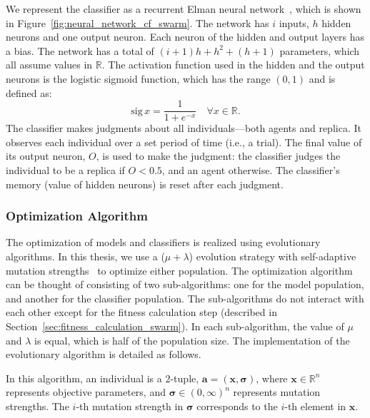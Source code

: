 We represent the classifier as a recurrent Elman neural network~\cite{Elman1990}, which is shown in Figure~\ref{fig:neural_network_cf_swarm}. The network has $i$ inputs, $h$ hidden neurons and one output neuron. Each neuron of the hidden and output layers has a bias. The network has a total of $(i+1) h + h^2 + (h+1)$ parameters, which all assume values in $\mathbb{R}$. The activation function used in the hidden and the output neurons is the logistic sigmoid function, which has the range $\left(0,1\right)$ and is defined as: 
%
\begin{equation}\label{equ:logistic_sigmoid}
\textrm{sig}\,x = \frac{1}{1+e^{-x}}\quad\forall x \in \mathbb{R}.
\end{equation}
%
The classifier makes judgments about all individuals---both agents and replica. It observes each individual over a set period of time (i.e., a trial). The final value of its output neuron, $O$, is used to make the judgment: the classifier judges the individual to be a replica if $O<0.5$, and an agent otherwise. The classifier's memory (value of hidden neurons) is reset after each judgment.

\subsubsection{Optimization Algorithm}\label{sec:optimization_algorithm_swarm}

The optimization of models and classifiers is realized using evolutionary algorithms. In this thesis, we use a ($\mu+\lambda$) evolution strategy with self-adaptive mutation strengths~\cite{Beyer2002, Eiben2003} to optimize either population. The optimization algorithm can be thought of consisting of two sub-algorithms: one for the model population, and another for the classifier population. The sub-algorithms do not interact with each other except for the fitness calculation step (described in Section~\ref{sec:fitness_calculation_swarm}). In each sub-algorithm, the value of $\mu$ and $\lambda$ is equal, which is half of the population size. The implementation of the evolutionary algorithm is detailed as follows.

In this algorithm, an individual is a 2-tuple,
$\mathbf{a}=\left(\mathbf{x},\boldsymbol{\sigma}\right)$, where $\mathbf{x\in\mathbb{R}}^n$ represents objective parameters, and $\boldsymbol{\sigma}\in \left(0,\infty\right)^n$
represents mutation strengths. The $i$-th mutation strength in $\boldsymbol{\sigma}$ corresponds to the $i$-th element in $\mathbf{x}$. 

